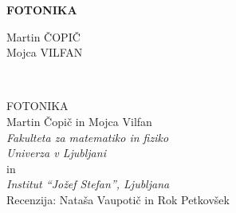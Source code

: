 \documentclass[11pt,fleqn]{book} %
\begin{document}
\let\cleardoublepage\clearpage
\makeatletter
\setlength{\@fptop}{0pt}
\makeatother




\begingroup
\thispagestyle{empty}
\centering
\vspace*{5cm}
\par\normalfont\fontsize{35}{35}\sffamily\selectfont
\textbf{FOTONIKA}
{\LARGE }\par %
\vspace*{1cm}
\vspace*{1cm}
\vspace*{8cm}
{\Large Martin ČOPIČ \\ Mojca VILFAN \\}\par %
\endgroup


\newpage
~\vfill
\thispagestyle{empty}

FOTONIKA \\

Martin Čopič in Mojca Vilfan\\
{\it Fakulteta za matematiko in fiziko\\
Univerza v Ljubljani}\\
in\\
{\it Institut ``Jožef Stefan'', Ljubljana}\\
 
 
 Recenzija: Nataša Vaupotič in Rok Petkovšek %

\end{document}
